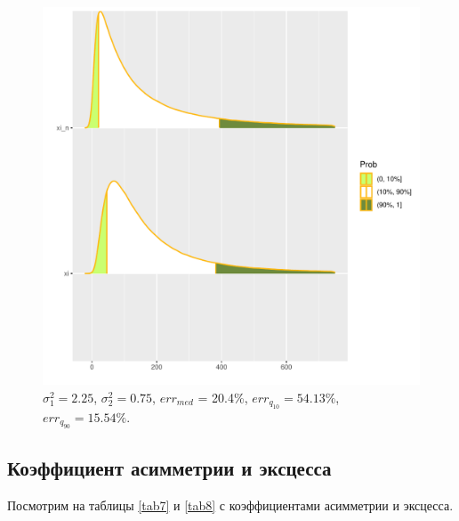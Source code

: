 \documentclass[specialist, substylefile = spbu.rtx,
subf,href,colorlinks=true, 12pt]{disser}
\begin{document}
\begin{figure}[!hhh]
	\begin{center}
		\begin{minipage}[h]{0.95\linewidth}
			\includegraphics[width=1\linewidth]{img/sr2.pdf}
			\caption{$\sigma_{1}^{2} = 2.25$, $\sigma_{2}^{2} = 0.75$, $err_{med}$ = 20.4\%,  $err_{q_{10}} = 54.13\%$,  $err_{q_{90}} = 15.54\%$. } %
			\label{ris4_5} %
		\end{minipage}
		
	\end{center}
\end{figure}

\subsection{Коэффициент асимметрии и эксцесса}
Посмотрим на таблицы \ref{tab7} и \ref{tab8} с коэффициентами асимметрии и эксцесса.
\end{document}
